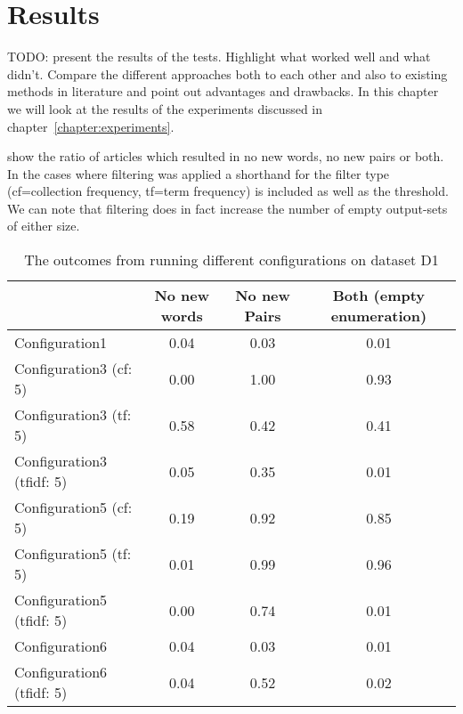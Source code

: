 \chapter{Results}
\label{chapter:results}
TODO: present the results of the tests. Highlight what worked well and what didn't. Compare the different approaches both to each other and also to existing methods in literature and point out advantages and drawbacks.
In this chapter we will look at the results of the experiments discussed in chapter~\ref{chapter:experiments}.

 show the ratio of articles which resulted in no new words, no new pairs or both. In the cases where filtering was applied a shorthand for the filter type (cf=collection frequency, tf=term frequency) is included as well as the threshold. We can note that filtering does in fact increase the number of empty output-sets of either size. 


\begin{table}
  \begin{tabular}{|l|c|c|c|}
    \hline
    &  No new words & No new Pairs & Both (empty enumeration) \\ \hline
    Configuration1                    & 0.04  & 0.03  & 0.01 \\ \hline
    Configuration3 (cf: 5)            & 0.00  & 1.00  & 0.93 \\ \hline
    Configuration3 (tf: 5)            & 0.58  & 0.42  & 0.41 \\ \hline
    Configuration3 (tfidf: 5)         & 0.05  & 0.35  & 0.01 \\ \hline
    Configuration5 (cf: 5)            & 0.19  & 0.92  & 0.85 \\ \hline
    Configuration5 (tf: 5)            & 0.01  & 0.99  & 0.96 \\ \hline
    Configuration5 (tfidf: 5)         & 0.00  & 0.74  & 0.01 \\ \hline
    Configuration6                    & 0.04  & 0.03  & 0.01 \\ \hline
    Configuration6 (tfidf: 5)         & 0.04  & 0.52  & 0.02 \\ \hline
  \end{tabular}
  \caption{The outcomes from running different configurations on dataset D1}
  \label{tab:d1}
\end{table}

